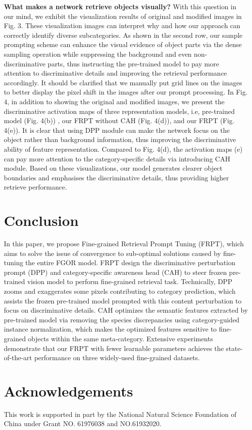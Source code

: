 \documentclass[letterpaper]{article} %
\begin{document}
\textbf{What makes a network retrieve objects visually?} With this question in our mind, we exhibit the visualization results of original and modified images in Fig. 3. These visualization images can interpret why and how our approach can correctly identify diverse subcategories. As shown in the second row, our sample prompting scheme can enhance the visual evidence of object parts via the dense sampling operation while suppressing the background and even non-discriminative parts, thus instructing the pre-trained model to pay more attention to discriminative details and improving the retrieval performance accordingly. 
It should be clarified that we manually put grid lines on the images to better display the pixel shift in the images after our prompt processing. In Fig. 4, in addition to showing the original and modified images, we present the discriminative activation maps of three representation models, i.e, pre-trained model (Fig. 4(b)) , our FRPT without CAH (Fig. 4(d)), and our FRPT (Fig. 4(e)). It is clear that using DPP module can make the network focus on the object rather than background information, thus improving the discriminative ability of feature representation. Compared to Fig. 4(d), the activation maps (e) can pay more attention to the category-specific details via introducing CAH module. Based on these visualizations, our model generates clearer object boundaries and emphasises the discriminative details, thus providing higher retrieve performance.





\section{Conclusion}
In this paper, we propose Fine-grained Retrieval Prompt Tuning (FRPT), which aims to solve the issue of convergence to sub-optimal solutions caused by fine-tuning the entire FGOR model. FRPT design the discriminative perturbation prompt (DPP) and category-specific awareness head (CAH) to steer frozen pre-trained vision model to perform fine-grained retrieval task. 
Technically, DPP zooms and exaggerates some pixels contributing to category prediction, which assists the frozen pre-trained model prompted with this content perturbation to focus on discriminative details. 
CAH optimizes the semantic features extracted by pre-trained model via removing the species discrepancies using category-guided instance normalization,  which makes the optimized features sensitive to fine-grained objects within the same meta-category.
Extensive experiments demonstrate that our FRPT with fewer learnable parameters achieves the state-of-the-art performance on three widely-used fine-grained datasets.
\section*{Acknowledgements}
This work is supported in part by the National Natural Science Foundation of China under Grant NO. 61976038 and NO.61932020.
%

\end{document}
